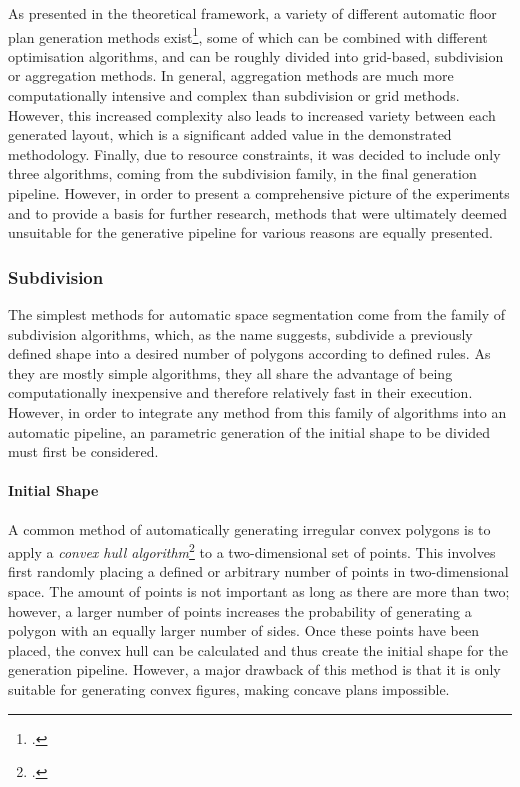 \documentclass[a4paper, 12pt]{report}
\begin{document}
As presented in the theoretical framework, a variety of different automatic floor plan generation methods exist\footcites{egor2020computer}{lopes2010constrained}{nisztuk2019hybrid}, some of which can be combined with different optimisation algorithms, and can be roughly divided into grid-based, subdivision or aggregation methods. In general, aggregation methods are much more computationally intensive and complex than subdivision or grid methods. However, this increased complexity also leads to increased variety between each generated layout, which is a significant added value in the demonstrated methodology. Finally, due to resource constraints, it was decided to include only three algorithms, coming from the subdivision family, in the final generation pipeline. However, in order to present a comprehensive picture of the experiments and to provide a basis for further research, methods that were ultimately deemed unsuitable for the generative pipeline for various reasons are equally presented.

\subsubsection{Subdivision}\label{subsubsec:subdivision}

The simplest methods for automatic space segmentation come from the family of subdivision algorithms, which, as the name suggests, subdivide a previously defined shape into a desired number of polygons according to defined rules. As they are mostly simple algorithms, they all share the advantage of being computationally inexpensive and therefore relatively fast in their execution. However, in order to integrate any method from this family of algorithms into an automatic pipeline, an parametric generation of the initial shape to be divided must first be considered.

\paragraph{Initial Shape}\label{par:initial-shape}

A common method of automatically generating irregular \gls{convex} polygons is to apply a \textit{convex hull algorithm}\footcite{anuradha2008voronoi} to a two-dimensional set of points. This involves first randomly placing a defined or arbitrary number of points in two-dimensional space. The amount of points is not important as long as there are more than two; however, a larger number of points increases the probability of generating a polygon with an equally larger number of sides. Once these points have been placed, the convex hull can be calculated and thus create the initial shape for the generation pipeline. However, a major drawback of this method is that it is only suitable for generating \gls{convex} figures, making concave plans impossible.
\end{document}
